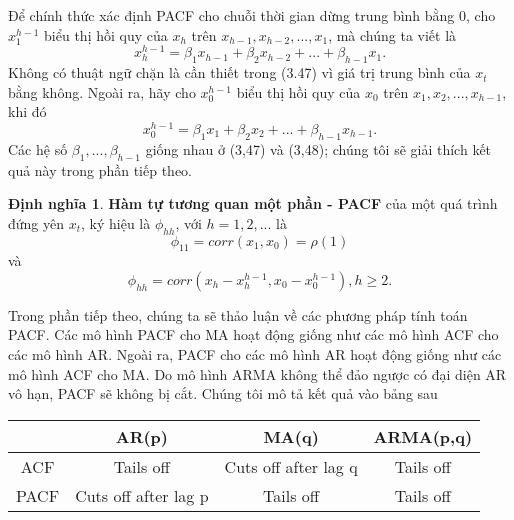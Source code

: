 \documentclass[12pt, a4paper,oneside]{book}
\theoremstyle{definition}
\newtheorem{dn}[theo]{Định nghĩa}
\begin{document}
Để chính thức xác định PACF cho chuỗi thời gian dừng trung bình bằng 0, cho $x_1^{h-1}$ biểu thị hồi quy của $x_{h}$ trên ${x_{h-1}, x_{h-2},...,x_{1}}$, mà chúng ta viết là 
$$x_h^{h-1}= \beta_{1}x_{h-1}+\beta_{2}x_{h-2}+...+\beta_{h-1}x_{1}.$$
Không có thuật ngữ chặn là cần thiết trong (3.47) vì giá trị trung bình của $x_{t}$ bằng không. Ngoài ra, hãy cho $x_0^{h-1}$ biểu thị hồi quy của $x_{0}$ trên ${x_{1},x_{2},...,x_{h-1}}$, khi đó 
$$x_0^{h-1} = \beta_{1}x_{1}+\beta_{2}x_{2}+...+\beta_{h-1}x_{h-1}.$$
Các hệ số $\beta_{1},...,\beta_{h-1}$ giống nhau ở (3,47) và (3,48); chúng tôi sẽ giải thích kết quả này trong phần tiếp theo.
\begin{dn}\textbf{Hàm tự tương quan một phần - PACF} của một quá trình đứng yên $x_{t}$, ký hiệu là $\phi_{hh}$, với $h=1,2,...$ là
	$$\phi_{11}=corr(x_{1},x_{0})=\rho(1)$$
và
$$\phi_{hh} = corr(x_{h}-x_h^{h-1}, x_{0}-x_0^{h-1}), h \geq 2. $$
\end{dn}
Trong phần tiếp theo, chúng ta sẽ thảo luận về các phương pháp tính toán PACF. Các mô hình PACF cho MA hoạt động giống như các mô hình ACF cho các mô hình AR. Ngoài ra, PACF cho các mô hình AR hoạt động giống như các mô hình ACF cho MA. Do mô hình ARMA không thể đảo ngược có đại diện AR vô hạn, PACF sẽ không bị cắt. Chúng tôi mô tả kết quả vào bảng sau
\begin{center}
\begin{tabular}{ |c|c|c|c| }
	\hline
	& AR(p) & MA(q) & ARMA(p,q)\\
	\hline
	\hline
	ACF & Tails off & Cuts off after lag q &  Tails off\\
	PACF&   Cuts off after lag p  & Tails off & Tails off\\
	\hline
\end{tabular}
\end{center}
\end{document}
